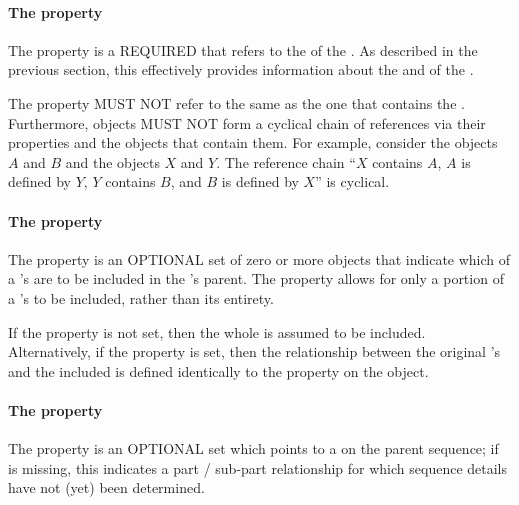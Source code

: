 \paragraph{The  property}
\label{sec:instanceOf}

The  property is a REQUIRED  that refers to the  of the .
As described in the previous section, this  effectively provides information about the  and  of the .

The  property MUST NOT refer to the same  as the one that contains the .
Furthermore,  objects MUST NOT form a cyclical chain of references via their  properties and the  objects that contain them.
For example, consider the  objects $A$ and $B$ and the  objects $X$ and $Y$. The reference chain ``$X$ contains $A$, $A$ is defined by $Y$, $Y$ contains $B$, and $B$ is defined by $X$'' is cyclical.

\paragraph{The  property}\label{sec:sourceLocation}

The  property is an OPTIONAL set of zero or more  objects that indicate which  of a 's  are to be included in the 's parent. The  property
allows for only a portion of a 's  to be included, rather than its entirety.

If the  property is not set, then the whole  is assumed to be included. Alternatively,
if the  property is set, then the relationship between the original 's
 and the included  is defined identically to the 
property on the  object.


\paragraph{The  property}\label{sec:location}
The  property is an OPTIONAL set which points to a  on the parent  sequence; if  is missing, this indicates a part / sub-part relationship for which sequence details have not (yet) been determined.

